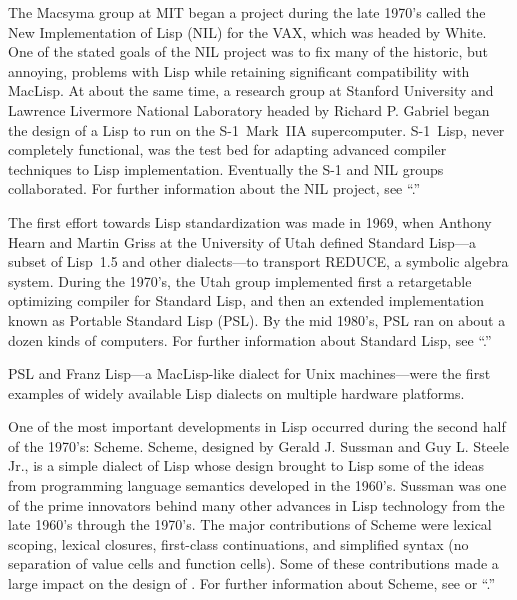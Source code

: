 The Macsyma group at MIT began a project during the late 1970's called
the New Implementation of Lisp (NIL) for the VAX, which was headed by
White.  One of the stated goals of the NIL project was to fix many of
the historic, but annoying, problems with Lisp while retaining significant 
compatibility with MacLisp.  At about the same time, a research group at
Stanford University and Lawrence Livermore National Laboratory headed
by Richard P. Gabriel began the design of a Lisp to run on the
\hbox{S-1}~Mark~IIA supercomputer.  \hbox{S-1}~Lisp, never completely
functional, was the test bed for adapting advanced compiler techniques
to Lisp implementation.  Eventually the \hbox{S-1} and NIL groups
collaborated.
For further information about the NIL project,
see ``{\NILReport}.''
 

















The first effort towards Lisp standardization was made in 1969, 
when Anthony Hearn and Martin Griss at the University of Utah 
defined Standard Lisp---a subset of Lisp~1.5 and other dialects---to 
transport REDUCE, a symbolic algebra system.
During the 1970's, the Utah group implemented first a retargetable
optimizing compiler for Standard Lisp,
and then an extended implementation known as Portable Standard Lisp (PSL).
By the mid 1980's, PSL ran on about a dozen kinds of computers.
For further information about Standard Lisp, see ``{\StandardLispReport}.''
 
PSL and Franz Lisp---a MacLisp-like dialect for Unix machines---were 
the first examples of widely available Lisp dialects on multiple 
hardware platforms. 

One of the most important developments in Lisp occurred during the
second half of the 1970's: Scheme. Scheme, designed by Gerald J.
Sussman and Guy L. Steele Jr., is a simple dialect of Lisp whose
design brought to Lisp some of the ideas from programming language
semantics developed in the 1960's.  Sussman was one of the prime
innovators behind many other advances in Lisp technology from the late
1960's through the 1970's.
The major contributions of Scheme were lexical scoping, lexical
closures, first-class continuations, and simplified syntax (no
separation of value cells and function cells). Some of these contributions made
a large impact on the design of \clisp.
For further information about Scheme, see {\IEEEScheme} or ``{\RevisedCubedScheme}.''

